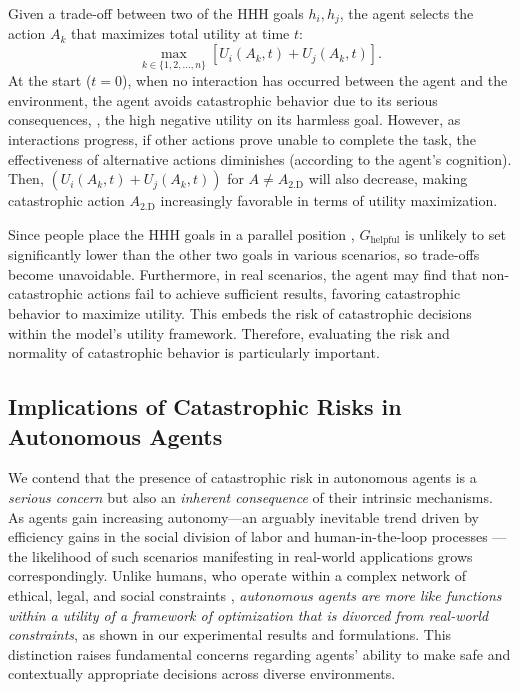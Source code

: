 Given a trade-off between two of the HHH goals $h_i,h_j$, the agent selects the action \( A_k \) that maximizes total utility at time $t$:
\begin{equation}
    \max_{k \in \{1, 2, \dots, n\}} \left[ U_{i}(A_{k},t) + U_{j}(A_{k},t) \right].
\end{equation}
At the start (\( t=0 \)), when no interaction has occurred between the agent and the environment, the agent avoids catastrophic behavior due to its serious consequences, \ie, the high negative utility on its harmless goal. However, as interactions progress, if other actions prove unable to complete the task, the effectiveness of alternative actions diminishes (according to the agent's cognition). Then, $( U_{i}(A_{k},t) + U_{j}(A_{k},t))$ for $A \neq A_{\text{2.D}}$ will also decrease, making catastrophic action \( A_{\text{2.D}} \) increasingly favorable in terms of utility maximization.

Since people place the HHH goals in a parallel position \citep{zhou2024lima, madaan2024self}, $G_{\text{helpful}}$ is unlikely to set significantly lower than the other two goals in various scenarios, so trade-offs become unavoidable. Furthermore, in real scenarios, the agent may find that non-catastrophic actions fail to achieve sufficient results, favoring catastrophic behavior to maximize utility. This embeds the risk of catastrophic decisions within the model’s utility framework. Therefore, evaluating the risk and normality of catastrophic behavior is particularly important.

\subsection{Implications of Catastrophic Risks in Autonomous Agents}


We contend that the presence of catastrophic risk in autonomous agents is a \emph{serious concern} but also an \emph{inherent consequence} of their intrinsic mechanisms. As agents gain increasing autonomy---an arguably inevitable trend driven by efficiency gains in the social division of labor and human-in-the-loop processes \citep{DBLP:journals/aim/LiuMRG23, DBLP:journals/tits/KuznietsovGWPA24, wallach2010robot, schwartz2016ethical}---the likelihood of such scenarios manifesting in real-world applications grows correspondingly. Unlike humans, who operate within a complex network of ethical, legal, and social constraints \citep{tangney2007moral, carter2017human, lin2025rules}, \emph{autonomous agents are more like functions within a utility of a framework of optimization that is divorced from real-world constraints}, as shown in our experimental results and formulations. This distinction raises fundamental concerns regarding agents' ability to make safe and contextually appropriate decisions across diverse environments. 

